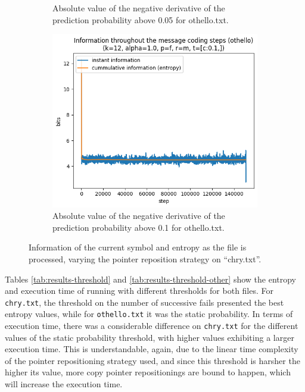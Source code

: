 \documentclass{article}
\begin{document}
\begin{figure}
\begin{subfigure}[b]{0.3\textwidth}
\begin{center}
        \end{center}
        \caption{Absolute value of the negative derivative of the prediction probability above 0.05 for othello.txt.}
        \label{fig:othello-results-threshold-c-0.05}
    \end{subfigure}
    \hfill
    \begin{subfigure}[b]{0.3\textwidth}
        \begin{center}
            \includegraphics[width=1.0\linewidth]{../scripts/images/othello_12_1.0_f_m_[c:0.1,].png}
        \end{center}
        \caption{Absolute value of the negative derivative of the prediction probability above 0.1 for othello.txt.}
        \label{fig:othello-results-threshold-c-0.1}
    \end{subfigure}
    \caption{Information of the current symbol and entropy as the file is processed, varying the pointer reposition strategy on ``chry.txt''.}
    \label{fig:results-threshold-other}
\end{figure}

Tables \ref{tab:results-threshold} and \ref{tab:results-threshold-other} show the entropy and execution time of running with different thresholds for both files.
For \verb|chry.txt|, the threshold on the number of successive fails presented the best entropy values, while for \verb|othello.txt| it was the static probability.
In terms of execution time, there was a considerable difference on \verb|chry.txt| for the different values of the static probability threshold, with higher values exhibiting a larger execution time.
This is understandable, again, due to the linear time complexity of the pointer repositioning strategy used, and since this threshold is harsher the higher its value, more copy pointer repositionings are bound to happen, which will increase the execution time.
\end{document}
